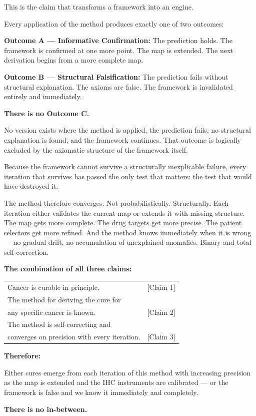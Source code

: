 \documentclass[11pt, a4paper]{article}
\begin{document}
This is the claim that transforms a framework into an
engine.

Every application of the method produces exactly one of
two outcomes:

\begin{mdframed}[backgroundcolor=claimbox,
                 linecolor=blue!40!black,
                 linewidth=1pt]
\textbf{Outcome A --- Informative Confirmation:}
The prediction holds. The framework is confirmed at one
more point. The map is extended. The next derivation begins
from a more complete map.

\medskip
\textbf{Outcome B --- Structural Falsification:}
The prediction fails without structural explanation. The
axioms are false. The framework is invalidated entirely and
immediately.

\medskip
\textbf{There is no Outcome C.}

No version exists where the method is applied, the
prediction fails, no structural explanation is found,
and the framework continues. That outcome is logically
excluded by the axiomatic structure of the framework itself.
\end{mdframed}

Because the framework cannot survive a structurally
inexplicable failure, every iteration that survives has
passed the only test that matters: the test that would
have destroyed it.

The method therefore converges. Not probabilistically.
Structurally. Each iteration either validates the current
map or extends it with missing structure. The map gets more
complete. The drug targets get more precise. The patient
selectors get more refined. And the method knows immediately
when it is wrong --- no gradual drift, no accumulation of
unexplained anomalies. Binary and total self-correction.

\bigskip
\noindent\textbf{The combination of all three claims:}

\begin{mdframed}[backgroundcolor=stakebox,
                 linecolor=orange!50!black,
                 linewidth=1.5pt]
\begin{center}
\begin{tabular}{ll}
Cancer is curable in principle. & [Claim 1]\\[0.3em]
The method for deriving the cure for &\\
\quad any specific cancer is known. & [Claim 2]\\[0.3em]
The method is self-correcting and &\\
\quad converges on precision with every iteration. & [Claim 3]
\end{tabular}
\end{center}

\medskip
\textbf{Therefore:}

Either cures emerge from each iteration of this method with
increasing precision as the map is extended and the IHC
instruments are calibrated --- or the framework is false
and we know it immediately and completely.

\medskip
\textbf{There is no in-between.}
\end{mdframed}
\end{document}
